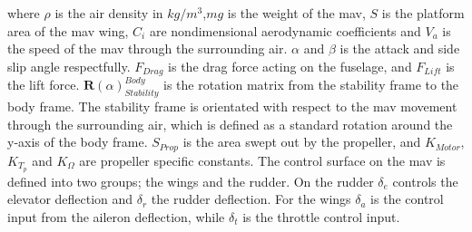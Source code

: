 where $\rho$ is the air density in $kg/m^3$,$mg$ is the weight of the \gls{mav}, $S$ is the platform area of the \gls{mav} wing, $C_i$ are nondimensional aerodynamic coefficients and $V_a$ is the speed of the \gls{mav} through the surrounding air. $\alpha$ and $\beta$ is the attack and side slip angle respectfully. $F_{Drag}$ is the drag force acting on the fuselage, and $F_{Lift}$ is the lift force. $\mathbf{R}(\alpha)_{Stability}^{Body}$ is the rotation matrix from the stability frame to the body frame. The stability frame is orientated with respect to the \gls{mav} movement through the surrounding air, which is defined as a standard rotation around the y-axis of the body frame. $S_{Prop}$ is the area swept out by the propeller, and $K_{Motor}$,$K_{T_p}$ and $K_\Omega$ are propeller specific constants. The control surface on the \gls{mav} is defined into two groups; the wings and the rudder. On the rudder $\delta_e$ controls the elevator deflection and $\delta_r$ the rudder deflection. For the wings $\delta_a$ is the control input from the aileron deflection, while $\delta_t$ is the throttle control input.
